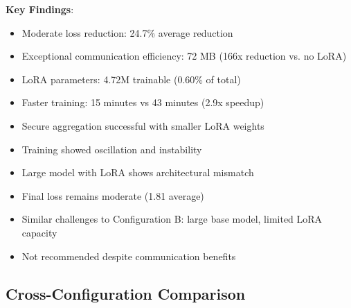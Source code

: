 \documentclass[conference]{IEEEtran}
\begin{document}
\textbf{Key Findings}:
\begin{itemize}
    \item Moderate loss reduction: 24.7\% average reduction
    \item Exceptional communication efficiency: 72 MB (166x reduction vs. no LoRA)
    \item LoRA parameters: 4.72M trainable (0.60\% of total)
    \item Faster training: 15 minutes vs 43 minutes (2.9x speedup)
    \item Secure aggregation successful with smaller LoRA weights
    \item Training showed oscillation and instability
    \item Large model with LoRA shows architectural mismatch
    \item Final loss remains moderate (1.81 average)
    \item Similar challenges to Configuration B: large base model, limited LoRA capacity
    \item Not recommended despite communication benefits
\end{itemize}

\subsection{Cross-Configuration Comparison}
\end{document}
